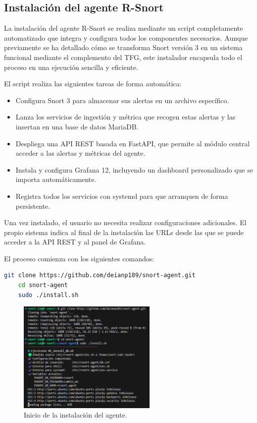 \documentclass[11pt,a4paper,twoside]{report}
\begin{document}
\subsection{Instalación del agente R-Snort}

La instalación del agente R-Snort se realiza mediante un script completamente automatizado que integra y configura todos los componentes necesarios. Aunque previamente se ha detallado cómo se transforma Snort versión 3 en un sistema funcional mediante el complemento del TFG, este instalador encapsula todo el proceso en una ejecución sencilla y eficiente.\newline

El script realiza las siguientes tareas de forma automática:

\begin{itemize}
	\item Configura Snort 3 para almacenar sus alertas en un archivo específico.
	\item Lanza los servicios de ingestión y métrica que recogen estas alertas y las insertan en una base de datos MariaDB.
	\item Despliega una API REST basada en FastAPI, que permite al módulo central acceder a las alertas y métricas del agente.
	\item Instala y configura Grafana 12, incluyendo un dashboard personalizado que se importa automáticamente.
	\item Registra todos los servicios con systemd para que arranquen de forma persistente.
\end{itemize}

Una vez instalado, el usuario no necesita realizar configuraciones adicionales. El propio sistema indica al final de la instalación las URLs desde las que se puede acceder a la API REST y al panel de Grafana.\newline

El proceso comienza con los siguientes comandos:

\begin{lstlisting}[language=bash, caption={Comandos de instalación del agente}, label={lst:instalacion-snort-agent}]
	git clone https://github.com/deianp189/snort-agent.git
	cd snort-agent
	sudo ./install.sh
\end{lstlisting}

\begin{figure}[H]
	\centering
	\includegraphics[width=0.6\textwidth]{install/4.png}
	\caption{Inicio de la instalación del agente.}
	\label{fig:inicio-snort-agent}
\end{figure}
\end{document}
